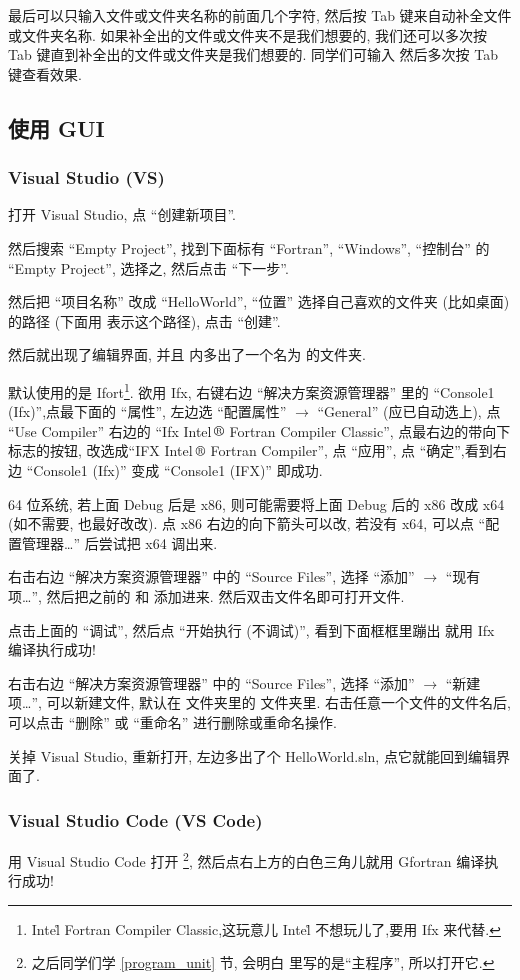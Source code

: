 最后可以只输入文件或文件夹名称的前面几个字符, 然后按 Tab 键来自动补全文件或文件夹名称. 如果补全出的文件或文件夹不是我们想要的, 我们还可以多次按 Tab 键直到补全出的文件或文件夹是我们想要的. 同学们可输入  然后多次按 Tab 键查看效果. 

\subsection{使用 GUI}

\subsubsection{Visual Studio (VS)}

打开 Visual Studio, 点 ``创建新项目''.

然后搜索 ``Empty Project'', 找到下面标有 ``Fortran'', ``Windows'', ``控制台'' 的 ``Empty Project'', 选择之, 然后点击 ``下一步''.

然后把 ``项目名称'' 改成 ``HelloWorld'', ``位置'' 选择自己喜欢的文件夹 (比如桌面) 的路径 (下面用 \ttt{[dir]} 表示这个路径), 点击 ``创建''.

然后就出现了编辑界面, 并且 \ttt{[dir]} 内多出了一个名为  的文件夹.

默认使用的是 Ifort\footnote{Intel\r{} Fortran Compiler Classic,这玩意儿 Intel\r{} 不想玩儿了,要用 Ifx 来代替.}. 欲用 Ifx, 右键右边 ``解决方案资源管理器'' 里的 ``Console1 (Ifx)'',点最下面的 ``属性'', 左边选 ``配置属性'' $\rightarrow$ ``General'' (应已自动选上), 点 ``Use Compiler'' 右边的 ``Ifx Intel$\,\text{\textregistered}$ Fortran Compiler Classic'', 点最右边的带向下标志的按钮, 改选成``IFX Intel$\,\text{\textregistered}$ Fortran Compiler'', 点 ``应用'', 点 ``确定'',看到右边 ``Console1 (Ifx)'' 变成 ``Console1 (IFX)'' 即成功.

64 位系统, 若上面 Debug 后是 x86, 则可能需要将上面 Debug 后的 x86 改成 x64 (如不需要, 也最好改改). 点 x86 右边的向下箭头可以改, 若没有 x64, 可以点 ``配置管理器\dots{}'' 后尝试把 x64 调出来.

右击右边 ``解决方案资源管理器'' 中的 ``Source Files'', 选择 ``添加'' $\rightarrow$ ``现有项\dots{}'', 然后把之前的  和  添加进来. 然后双击文件名即可打开文件.

点击上面的 ``调试'', 然后点 ``开始执行 (不调试)'', 看到下面框框里蹦出  就用 Ifx 编译执行成功!

右击右边 ``解决方案资源管理器'' 中的 ``Source Files'', 选择 ``添加'' $\rightarrow$ ``新建项\dots{}'', 可以新建文件, 默认在  文件夹里的  文件夹里. 右击任意一个文件的文件名后, 可以点击 ``删除'' 或 ``重命名'' 进行删除或重命名操作.

关掉 Visual Studio, 重新打开, 左边多出了个 HelloWorld.sln, 点它就能回到编辑界面了.

\subsubsection{Visual Studio Code (VS Code)}

用 Visual Studio Code 打开 \footnote{之后同学们学 \ref{program_unit} 节, 会明白  里写的是``主程序'', 所以打开它.}, 然后点右上方的白色三角儿就用 Gfortran 编译执行成功!

